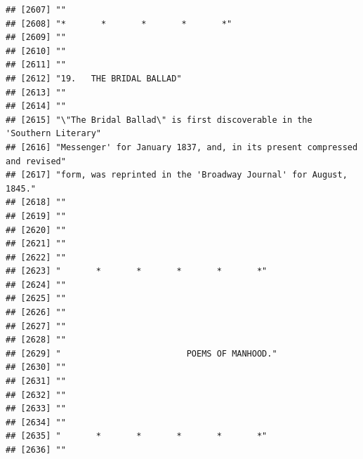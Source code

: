\documentclass{article}\usepackage[]{graphicx}\usepackage[]{color}
\makeatletter
\newenvironment{kframe}{%
 \def\at@end@of@kframe{}%
 \ifinner\ifhmode%
  \def\at@end@of@kframe{\end{minipage}}%
  \begin{minipage}{\columnwidth}%
 \fi\fi%
 \def\FrameCommand##1{\hskip\@totalleftmargin \hskip-\fboxsep
 \colorbox{shadecolor}{##1}\hskip-\fboxsep
     \hskip-\linewidth \hskip-\@totalleftmargin \hskip\columnwidth}%
 \MakeFramed {\advance\hsize-\width
   \@totalleftmargin\z@ \linewidth\hsize
   \@setminipage}}%
 {\par\unskip\endMakeFramed%
 \at@end@of@kframe}
\newenvironment{knitrout}{}{} %
\makeatother
\begin{document}
\begin{knitrout}
\begin{kframe}
\begin{verbatim}
## [2607] ""                                                                            
## [2608] "*       *       *       *       *"                                           
## [2609] ""                                                                            
## [2610] ""                                                                            
## [2611] ""                                                                            
## [2612] "19.   THE BRIDAL BALLAD"                                                     
## [2613] ""                                                                            
## [2614] ""                                                                            
## [2615] "\"The Bridal Ballad\" is first discoverable in the 'Southern Literary"       
## [2616] "Messenger' for January 1837, and, in its present compressed and revised"     
## [2617] "form, was reprinted in the 'Broadway Journal' for August, 1845."             
## [2618] ""                                                                            
## [2619] ""                                                                            
## [2620] ""                                                                            
## [2621] ""                                                                            
## [2622] ""                                                                            
## [2623] "       *       *       *       *       *"                                    
## [2624] ""                                                                            
## [2625] ""                                                                            
## [2626] ""                                                                            
## [2627] ""                                                                            
## [2628] ""                                                                            
## [2629] "                         POEMS OF MANHOOD."                                  
## [2630] ""                                                                            
## [2631] ""                                                                            
## [2632] ""                                                                            
## [2633] ""                                                                            
## [2634] ""                                                                            
## [2635] "       *       *       *       *       *"                                    
## [2636] ""                                                                            

\end{verbatim}
\end{kframe}
\end{knitrout}
\end{document}
